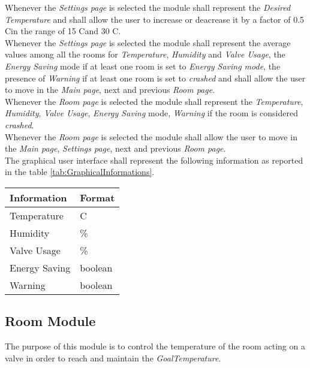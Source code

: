 Whenever the \textit{Settings page} is selected the module shall represent the \textit{Desired Temperature} and shall allow the user to increase or deacrease it by a factor of 0.5 C\degree in the range of 15 C\degree and 30 C\degree.\\
Whenever the \textit{Settings page} is selected the module  shall represent the average values among all the rooms for \textit{Temperature}, \textit{Humidity} and \textit{Valve Usage}, 
the \textit{Energy Saving} mode if at least one room is set to \textit{Energy Saving mode}, the presence of \textit{Warning} if at least one room is set to \textit{crashed} 
and shall allow the user to move in the \textit{Main page}, next and previous \textit{Room page}.\\

Whenever the \textit{Room page} is selected the module shall represent the \textit{Temperature}, \textit{Humidity}, \textit{Valve Usage}, \textit{Energy Saving} mode, \textit{Warning} if the room is considered \textit{crashed}.\\
Whenever the \textit{Room page} is selected the module shall allow the user to move in the \textit{Main page}, \textit{Settings page}, next and previous \textit{Room page}.\\

The graphical user interface shall represent the following information as reported in the table \ref{tab:GraphicalInformations}.
\begin{table}[H]
	\centering
			\begin{tabular}{||l | l||} 
			\hline
			\textbf{Information}	& \textbf{Format} \\ 
			\hline
			Temperature	& C\degree \\ 
			\hline
			Humidity	& \% \\ 
			\hline
			Valve Usage		& \% \\ 
			\hline
			Energy Saving	& boolean \\ 
			\hline
			Warning		& boolean \\ 
			\hline
		\end{tabular}
\end{table}

\subsection{Room Module}
The purpose of this module is to control the temperature of the room acting on a valve in order to 
reach and maintain the \textit{GoalTemperature}.

